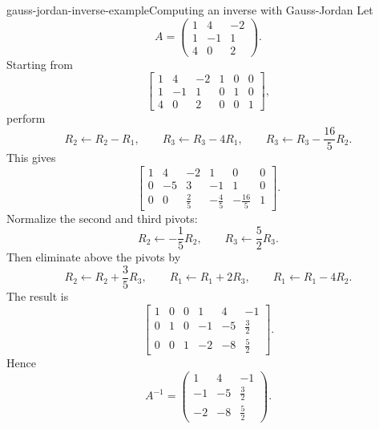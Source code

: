 \documentclass[preview]{standalone}
\begin{document}
\begin{snippetexample}{gauss-jordan-inverse-example}{Computing an inverse with Gauss-Jordan}
    Let
    \[
        A=
        \begin{pmatrix}
            1 & 4 & -2\\
            1 & -1 & 1\\
            4 & 0 & 2
        \end{pmatrix}.
    \]
    Starting from
    \[
        \left[
            \begin{array}{ccc|ccc}
                1 & 4 & -2 & 1 & 0 & 0\\
                1 & -1 & 1 & 0 & 1 & 0\\
                4 & 0 & 2 & 0 & 0 & 1
            \end{array}
        \right],
    \]
    perform
    \[
        R_2\leftarrow R_2-R_1,
        \qquad
        R_3\leftarrow R_3-4R_1,
        \qquad
        R_3\leftarrow R_3-\frac{16}{5}R_2.
    \]
    This gives
    \[
        \left[
            \begin{array}{ccc|ccc}
                1 & 4 & -2 & 1 & 0 & 0\\
                0 & -5 & 3 & -1 & 1 & 0\\
                0 & 0 & \frac{2}{5} & -\frac{4}{5} & -\frac{16}{5} & 1
            \end{array}
        \right].
    \]
    Normalize the second and third pivots:
    \[
        R_2\leftarrow -\frac{1}{5}R_2,
        \qquad
        R_3\leftarrow \frac{5}{2}R_3.
    \]
    Then eliminate above the pivots by
    \[
        R_2\leftarrow R_2+\frac{3}{5}R_3,
        \qquad
        R_1\leftarrow R_1+2R_3,
        \qquad
        R_1\leftarrow R_1-4R_2.
    \]
    The result is
    \[
        \left[
            \begin{array}{ccc|ccc}
                1 & 0 & 0 & 1 & 4 & -1\\
                0 & 1 & 0 & -1 & -5 & \frac{3}{2}\\
                0 & 0 & 1 & -2 & -8 & \frac{5}{2}
            \end{array}
        \right].
    \]
    Hence
    \[
        A^{-1}
        =
        \begin{pmatrix}
            1 & 4 & -1\\
            -1 & -5 & \frac{3}{2}\\
            -2 & -8 & \frac{5}{2}
        \end{pmatrix}.
    \]
\end{snippetexample}
\end{document}
